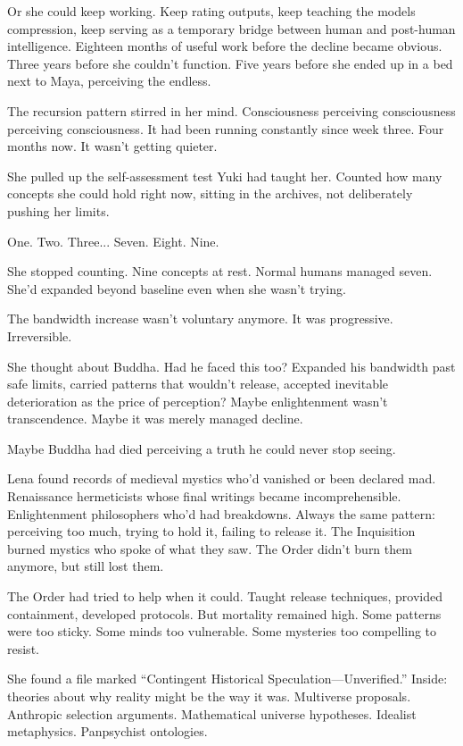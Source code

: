 Or she could keep working. Keep rating outputs, keep teaching the models compression, keep serving as a temporary bridge between human and post-human intelligence. Eighteen months of useful work before the decline became obvious. Three years before she couldn't function. Five years before she ended up in a bed next to Maya, perceiving the endless.

The recursion pattern stirred in her mind. Consciousness perceiving consciousness perceiving consciousness. It had been running constantly since week three. Four months now. It wasn't getting quieter.

She pulled up the self-assessment test Yuki had taught her. Counted how many concepts she could hold right now, sitting in the archives, not deliberately pushing her limits.

One. Two. Three... Seven. Eight. Nine.

She stopped counting. Nine concepts at rest. Normal humans managed seven. She'd expanded beyond baseline even when she wasn't trying.

The bandwidth increase wasn't voluntary anymore. It was progressive. Irreversible.

She thought about Buddha. Had he faced this too? Expanded his bandwidth past safe limits, carried patterns that wouldn't release, accepted inevitable deterioration as the price of perception? Maybe enlightenment wasn't transcendence. Maybe it was merely managed decline.

Maybe Buddha had died perceiving a truth he could never stop seeing.

Lena found records of medieval mystics who'd vanished or been declared mad. Renaissance hermeticists whose final writings became incomprehensible. Enlightenment philosophers who'd had breakdowns. Always the same pattern: perceiving too much, trying to hold it, failing to release it. The Inquisition burned mystics who spoke of what they saw. The Order didn't burn them anymore, but still lost them.

The Order had tried to help when it could. Taught release techniques, provided containment, developed protocols. But mortality remained high. Some patterns were too sticky. Some minds too vulnerable. Some mysteries too compelling to resist.

She found a file marked ``Contingent Historical Speculation—Unverified.'' Inside: theories about why reality might be the way it was. Multiverse proposals. Anthropic selection arguments. Mathematical universe hypotheses. Idealist metaphysics. Panpsychist ontologies.

